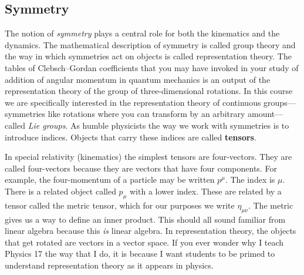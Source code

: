 \documentclass[12pt, oneside]{report}    %
\begin{document}
\subsection{Symmetry}

The notion of \emph{symmetry} plays a central role for both the kinematics and the dynamics. The mathematical description of symmetry is called group theory and the way in which symmetries act on objects is called representation theory. The tables of Clebsch--Gordan coefficients that you may have invoked in your study of addition of angular momentum in quantum mechanics is an output of the representation theory of the group of three-dimensional rotations. In this course we are specifically interested in the representation theory of continuous groups---symmetries like rotations where you can transform by an arbitrary amount---called \emph{Lie groups}. As humble physicists the way we work with symmetries is to introduce indices. Objects that carry these indices are called \textbf{tensors}.

In special relativity (kinematics) the simplest tensors are four-vectors. They are called four-vectors because they are vectors that have four components. For example, the four-momentum of a particle may be written $p^\mu$. The index is $\mu$. There is a related object called $p_\mu$ with a lower index. These are related by a tensor called the metric tensor, which for our purposes we write $\eta_{\mu\nu}$. The metric gives us a way to define an inner product. This should all sound familiar from linear algebra because this \emph{is} linear algebra. In representation theory, the objects that get rotated are vectors in a vector space. If you ever wonder why I teach Physics 17 the way that I do, it is because I want students to be primed to understand representation theory as it appears in physics.
\end{document}
